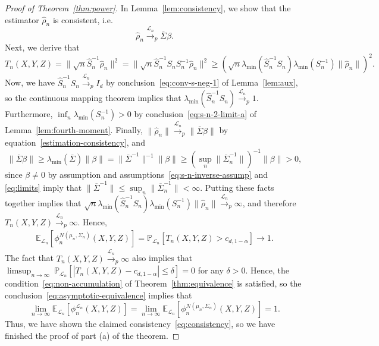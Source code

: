 \documentclass[12pt]{article}
\theoremstyle{definition}
\theoremstyle{remark}
\newcommand{\srx}{X}
\newcommand{\srz}{Z}
\newcommand{\sry}{Y}
\begin{document}
\begin{proof}[Proof of Theorem~\ref{thm:power}]
	
In Lemma~\ref{lem:consistency}, we show that the estimator $\widehat \rho_n$ is consistent, i.e. 
\begin{equation}
\widehat \rho_n \overset{\mathcal L_n}\rightarrow_p \overline\Sigma \beta. 
\label{estimation-consistency}
\end{equation}
Next, we derive that
\begin{equation*}
T_n(\srx, \sry, \srz) = \|\sqrt n\widehat S_n^{-1}\widehat \rho_n\|^2 = \|\sqrt n\widehat S_n^{-1}S_n S_n^{-1}\widehat \rho_n\|^2 \geq \left(\sqrt{n}\lambda_{\min}(\widehat S_n^{-1}S_n)\lambda_{\min}(S_n^{-1}) \|\widehat \rho_n\|\right)^2.
\end{equation*}
Now, we have $\widehat S_n^{-1}S_n \overset{\mathcal L_n}\rightarrow _p  I_d$ by conclusion~\eqref{eq:conv-s-neg-1} of Lemma~\ref{lem:aux}, so the continuous mapping theorem implies that $\lambda_{\min}(\widehat S_n^{-1}S_n) \overset{\mathcal L_n}\rightarrow _p 1$. Furthermore, $\inf_n \lambda_{\min}(S_n^{-1}) > 0$ by conclusion~\eqref{eq:s-n-2-limit-a} of Lemma~\ref{lem:fourth-moment}. Finally, $\|\widehat \rho_n\| \overset{\mathcal L_n}\rightarrow _p \|\overline \Sigma \beta\|$ by equation~\eqref{estimation-consistency}, and 
\[
\|\overline \Sigma \beta\| \geq \lambda_{\min}(\overline \Sigma)\|\beta\| = \|\overline \Sigma^{-1}\|^{-1}\|\beta\| \geq \left(\sup_n \|\overline \Sigma_n^{-1}\|\right)^{-1}\|\beta\| > 0,
\]
since $\beta \neq 0$ by assumption and assumptions~\eqref{eq:s-n-inverse-assump} and \eqref{eq:limits} imply that $\|\overline \Sigma^{-1}\| \leq \sup_n \|\overline \Sigma_n^{-1}\| < \infty$. Putting these facts together implies that $\sqrt{n}\lambda_{\min}(\widehat S_n^{-1}S_n)\lambda_{\min}(S_n^{-1}) \|\widehat \rho_n\|\overset{\mathcal L_n}\rightarrow _p \infty$, and therefore $T_n(\srx, \sry, \srz) \overset{\mathcal L_n}\rightarrow _p \infty$. Hence,
\begin{equation}
\begin{split}
\mathbb E_{\mathcal L_n}[\phi_n^{N(\mu_n, \Sigma_n)}(\srx, \sry, \srz)] = \mathbb P_{\mathcal L_n}[T_n(\srx, \sry, \srz) > c_{d,1-\alpha}] \rightarrow 1.
\end{split}
\end{equation}
The fact that $T_n(\srx, \sry, \srz) \overset{\mathcal L_n}\rightarrow _p \infty$ also implies that $\limsup_{n \rightarrow \infty}\ \mathbb P_{\mathcal L_n}[|T_n(\srx, \sry, \srz)-c_{d,1-\alpha}| \leq \delta] = 0$ for any $\delta > 0$. Hence, the condition~\eqref{eq:non-accumulation} of Theorem~\ref{thm:equivalence} is satisfied, so the conclusion~\eqref{eq:asymptotic-equivalence} implies that
\begin{equation*}
\lim_{n \rightarrow \infty}\mathbb E_{\mathcal L_n}[\phi_n^{\mathcal L_n}(\srx, \sry, \srz)] = \lim_{n \rightarrow \infty}\mathbb E_{\mathcal L_n}[\phi_n^{N(\mu_n, \Sigma_n)}(\srx, \sry, \srz)] = 1.
\end{equation*} 
Thus, we have shown the claimed consistency~\eqref{eq:consistency}, so we have finished the proof of part (a) of the theorem.
	

\end{proof}
\end{document}

